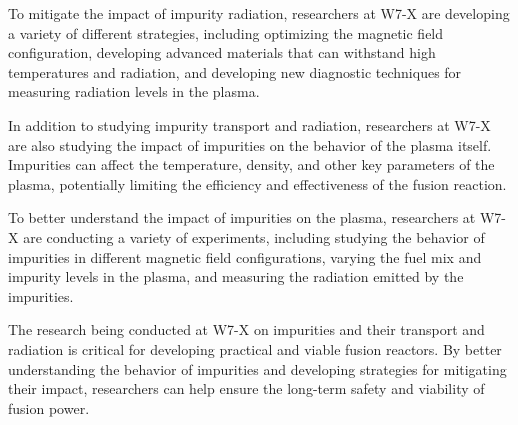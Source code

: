\documentclass[12pt]{article}
\begin{document}
To mitigate the impact of impurity radiation, researchers at W7-X are developing a variety of different strategies, including optimizing the magnetic field configuration, developing advanced materials that can withstand high temperatures and radiation, and developing new diagnostic techniques for measuring radiation levels in the plasma.

In addition to studying impurity transport and radiation, researchers at W7-X are also studying the impact of impurities on the behavior of the plasma itself. Impurities can affect the temperature, density, and other key parameters of the plasma, potentially limiting the efficiency and effectiveness of the fusion reaction.

To better understand the impact of impurities on the plasma, researchers at W7-X are conducting a variety of experiments, including studying the behavior of impurities in different magnetic field configurations, varying the fuel mix and impurity levels in the plasma, and measuring the radiation emitted by the impurities.

The research being conducted at W7-X on impurities and their transport and radiation is critical for developing practical and viable fusion reactors. By better understanding the behavior of impurities and developing strategies for mitigating their impact, researchers can help ensure the long-term safety and viability of fusion power.
\end{document}

